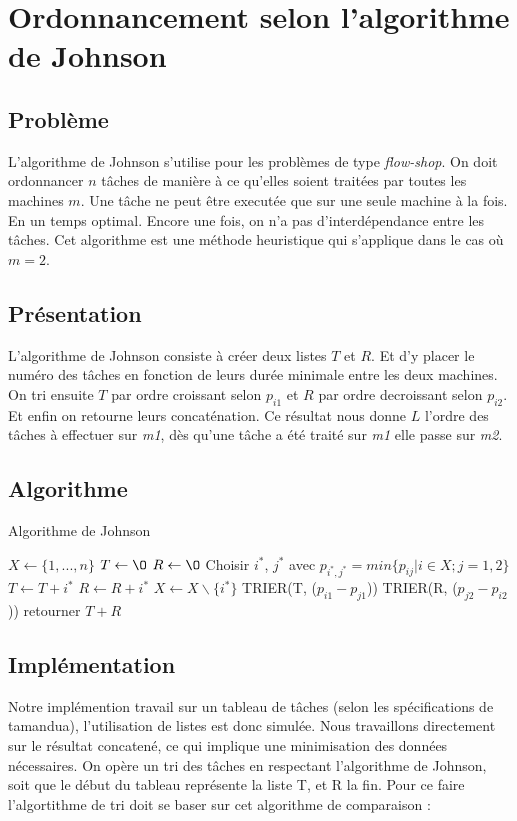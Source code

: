 \section{Ordonnancement selon l'algorithme de Johnson}
\subsection{Problème}
L'algorithme de Johnson s'utilise pour les problèmes de type {\em flow-shop}.
On doit ordonnancer $n$ tâches de manière à ce qu'elles soient traitées par
toutes les machines $m$.
Une tâche ne peut être executée que sur une seule machine à la
fois. En un temps optimal. Encore une fois, on n'a pas d'interdépendance entre
les tâches. Cet algorithme est une méthode heuristique qui s'applique 
dans le cas où $m=2$.

\subsection{Présentation}
L'algorithme de Johnson consiste à créer deux listes $T$ et $R$. Et d'y placer 
le numéro des tâches en fonction de leurs durée minimale entre les deux 
machines. On tri ensuite $T$ par ordre croissant selon $p_{i1}$ et $R$ par
ordre decroissant selon $p_{i2}$. Et enfin on retourne leurs concaténation.
Ce résultat nous donne $L$ l'ordre des tâches à effectuer sur {\em m1},
dès qu'une tâche a été traité sur {\em m1} elle passe sur {\em m2}.

\subsection{Algorithme}
\begin{algorithm}
\caption{Algorithme de Johnson}
\begin{algorithmic}
\STATE $X \leftarrow \{1,...,n\}$
\STATE $T \leftarrow \O$
\STATE $R \leftarrow \O$
	\STATE Choisir $i^*$, $j^*$ avec $p_{i^*,j^*} = min\{p_{ij}|i \in X; j = 1,2\}$
		\STATE $T \leftarrow T + i^*$
	\ELSE
		\STATE $R \leftarrow R + i^*$
	\ENDIF
	\STATE $X \leftarrow X\backslash\{i^*\}$
\ENDWHILE
\STATE TRIER(T, ($p_{i1} - p_{j1}$))
\STATE TRIER(R, ($p_{j2} - p_{i2}$))
\STATE retourner $T + R$
\end{algorithmic}
\end{algorithm}

\subsection{Implémentation}
Notre implémention travail sur un tableau de tâches (selon les spécifications de
tamandua), l'utilisation de listes est donc simulée.
Nous travaillons directement sur le résultat concatené, ce qui implique une
minimisation des données nécessaires. On opère un tri des tâches en respectant
l'algorithme de Johnson, soit que le début du tableau représente la liste T,
et R la fin. Pour ce faire l'algortithme de tri doit se baser sur cet algorithme
de comparaison :

